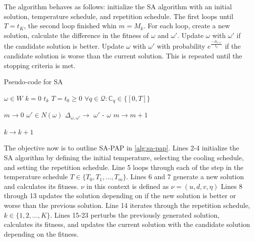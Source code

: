 \documentclass[11pt,a4paper,final]{article}
\newcommand{\Tau}{T}                        %
\newcommand{\C}{\mathbb{C}}                 %
\newcommand{\Qset}{\mathcal{Q}}             %
\begin{document}
The algorithm behaves as follows: initialize the SA algorithm with an initial solution, temperature schedule, and
repetition schedule. The first loops until \(T = t_K\), the second loop finished whin \(m = M_k\). For each loop, create a
new solution, calculate the difference in the fitness of \(\omega\) and \(\omega'\). Update \(\omega\) with \(\omega'\) if the candidate solution is
better. Update \(\omega\) with \(\omega'\) with probability \(e^{\frac{-\Delta_{\omega , \omega'}}{t_k}}\) if the candidate solution is worse than the
current solution. This is repeated until the stopping criteria is met.

\begin{algorithm}[H]
\caption{Pseudo-code for SA} \label{alg:sa-pseudo}
    \LinesNumbered

    \Begin
    {
        $\omega \in W$ 
        $k=0$ 
        $t_k$ 
        $T = t_0 \geq 0$ 
        $\forall q \in \Qset : \C_q \in \{[0,T]\}$ 

        {
            $m \rightarrow 0$ 
            {
                $\omega' \in N(\omega)$ 
                $\Delta_{\omega,\omega'} \rightarrow$ \f{$\omega'$} - \f{$\omega$} 
                $m \rightarrow m+1$\;
            }

        $k \rightarrow k+1$\;
        }
    }
\end{algorithm}

The objective now is to outline SA-PAP in \ref{alg:sa-pap}. Lines 2-4 initialize the SA algorithm by defining the initial
temperature, selecting the cooling schedule, and setting the repetition schedule. Line 5 loops through each of the step
in the temperature schedule \(\Tau \in \{ \Tau_0, \Tau_1, ..., \Tau_m \}\). Lines 6 and 7 generate a new solution and
calculates its fitness. \(\nu\) in this context is defined as \(\nu = (u, d, v, \eta)\) Lines 8 through 13 updates the solution
depending on if the new solution is better or worse than the previous solution. Line 14 iterates through the repetition
schedule, \(k \in \{1, 2, ..., K\}\). Lines 15-23 perturbs the previously generated solution, calculates its fitness, and
updates the current solution with the candidate solution depending on the fitness.
\end{document}
